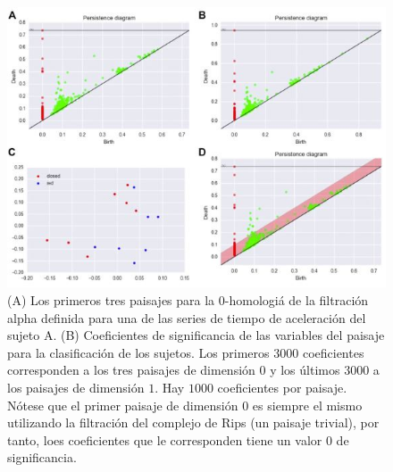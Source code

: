 \begin{figure}[ht]
    \centering
    \includegraphics[width=0.85\linewidth]{./figures/Figura14.JPG}
    \caption{
        (A) Los primeros tres paisajes para la $0$-homologi\'a de la filtraci\'on alpha
        definida para una de las series de tiempo de aceleraci\'on del sujeto A.
        (B) Coeficientes de significancia de las variables del paisaje para la clasificaci\'on
        de los sujetos.
        Los primeros $3000$ coeficientes corresponden a los tres paisajes de dimensi\'on $0$
        y los \'ultimos $3000$ a los paisajes de dimensi\'on $1$.
        Hay $1000$ coeficientes por paisaje.
        N\'otese que el primer paisaje de dimensi\'on $0$ es siempre el mismo
        utilizando la filtraci\'on del complejo de Rips (un paisaje trivial), por tanto,
        loes coeficientes que le corresponden tiene un valor $0$ de significancia.
    }
    \label{fig:Figura 15}
    \vspace{15pt}
\end{figure}